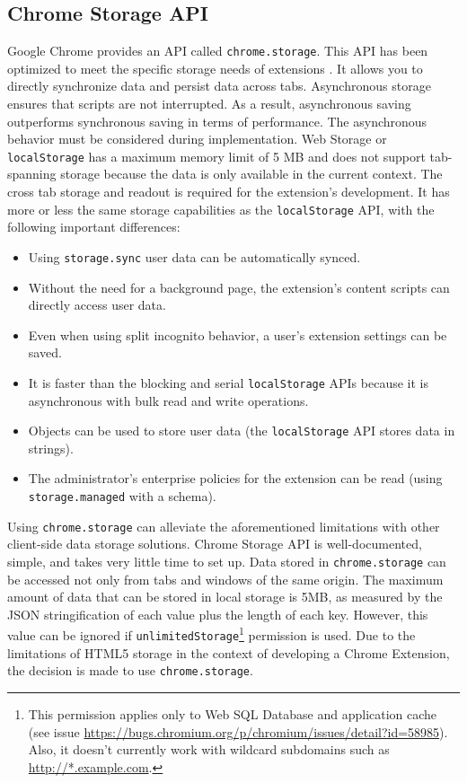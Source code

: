 \subsection*{Chrome Storage API}
Google Chrome provides an API called \texttt{chrome.storage}. This API has been optimized to meet the specific storage needs of extensions \autocite{chrome2021storage}. It allows you to directly synchronize data and persist data across tabs. Asynchronous storage ensures that scripts are not interrupted. As a result, asynchronous saving outperforms synchronous saving in terms of performance. The asynchronous behavior must be considered during implementation. Web Storage or \texttt{localStorage} has a maximum memory limit of 5 MB and does not support tab-spanning storage because the data is only available in the current context. The cross tab storage and readout is required for the extension's development. It has more or less the same storage capabilities as the \texttt{localStorage} API, with the following important differences:

\begin{itemize}
  \item Using \texttt{storage.sync} user data can be automatically synced.
  \item Without the need for a background page, the extension's content scripts can directly access user data.
  \item Even when using split incognito behavior, a user's extension settings can be saved.
  \item It is faster than the blocking and serial \texttt{localStorage} APIs because it is asynchronous with bulk read and write operations.
  \item Objects can be used to store user data (the \texttt{localStorage} API stores data in strings).
  \item The administrator's enterprise policies for the extension can be read (using \texttt{storage.managed} with a schema).
\end{itemize}

Using \texttt{chrome.storage} can alleviate the aforementioned limitations with other client-side data storage solutions. Chrome Storage API is well-documented, simple, and takes very little time to set up. Data stored in \texttt{chrome.storage} can be accessed not only from tabs and windows of the same origin. The maximum amount of data that can be stored in local storage is 5MB, as measured by the JSON stringification of each value plus the length of each key. However, this value can be ignored if \texttt{unlimitedStorage}\footnote{This permission applies only to Web SQL Database and application cache (see issue \url{https://bugs.chromium.org/p/chromium/issues/detail?id=58985}). Also, it doesn't currently work with wildcard subdomains such as \url{http://*.example.com}.} permission is used. Due to the limitations of HTML5 storage in the context of developing a Chrome Extension, the decision is made to use \texttt{chrome.storage}.
